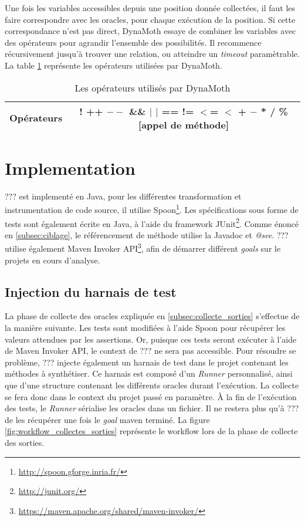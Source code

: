 \par Une fois les variables accessibles depuis une position donnée collectées, il faut les faire correspondre avec les oracles, pour chaque exécution de la position. Si cette correspondance n'est pas direct, DynaMoth essaye de combiner les variables avec des opérateurs pour agrandir l'ensemble des possibilités. Il recommence récursivement jusqu'à trouver une relation, ou atteindre un \textit{timeout} paramètrable. La table \ref{fig:operateurs} représente les opérateurs utilisées par DynaMoth.

\begin{table}[H]
\centering
\begin{tabular}{|c|c|}
\hline
Opérateurs & ! ++ $--$ \&\& $|$ $|$ == != $<$= $<$ + $-$ * / \% [appel de méthode]\\
\hline
\end{tabular}
\caption{Les opérateurs utilisés par DynaMoth}
\label{fig:operateurs}
\end{table}
 

\section{Implementation}
\label{sec:implementation}

\par ??? est implementé en Java, pour les différentes transformation et instrumentation de code source, il utilise Spoon\footnote{\url{http://spoon.gforge.inria.fr/}}. Les spécifications sous forme de tests sont également écrite en Java, à l'aide du framework JUnit\footnote{\url{http://junit.org/}}. Comme énoncé en \ref{subsec:ciblage}, le référencement de méthode utilise la Javadoc et \textit{@see}. ??? utilise également Maven Invoker API\footnote{\url{https://maven.apache.org/shared/maven-invoker/}}, afin de démarrer différent \textit{goals} sur le projets en cours d'analyse.


\subsection{Injection du harnais de test}

\par La phase de collecte des oracles expliquée en \ref{subsec:collecte_sorties} s'effectue de la manière suivante. Les tests sont modifiées à l'aide Spoon pour récupérer les valeurs attendues par les assertions. Or, puisque ces tests seront exécuter à l'aide de Maven Invoker API, le context de ??? ne sera pas accessible. Pour résoudre se problème, ??? injecte également un harnais de test dans le projet contenant les méthodes à synthétiser. Ce harnais est composé d'un \textit{Runner} personnalisé, ainsi que d'une structure contenant les différents oracles durant l'exécution. La collecte se fera donc dans le context du projet passé en paramètre. À la fin de l'exécution des tests, le \textit{Runner} sérialise les oracles dans un fichier. Il ne restera plus qu'à ??? de les récupérer une fois le \textit{goal} maven terminé. La figure \ref{fig:workflow_collectes_sorties} représente le workflow lors de la phase de collecte des sorties.

